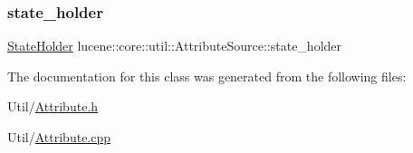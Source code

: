 \subsubsection{\texorpdfstring{state\+\_\+holder}{state\_holder}}
{\footnotesize\ttfamily \mbox{\hyperlink{classlucene_1_1core_1_1util_1_1AttributeSource_1_1StateHolder}{State\+Holder}} lucene\+::core\+::util\+::\+Attribute\+Source\+::state\+\_\+holder\hspace{0.3cm}{\ttfamily [private]}}



The documentation for this class was generated from the following files\+:\begin{DoxyCompactItemize}
\item 
Util/\mbox{\hyperlink{Util_2Attribute_8h}{Attribute.\+h}}\item 
Util/\mbox{\hyperlink{Util_2Attribute_8cpp}{Attribute.\+cpp}}\end{DoxyCompactItemize}
